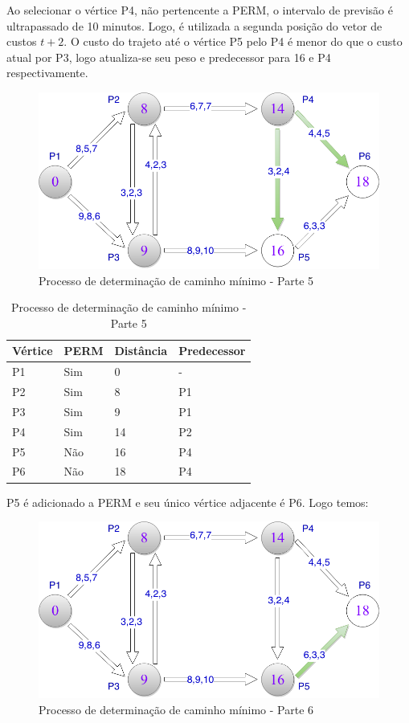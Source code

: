 Ao selecionar o vértice P4, não pertencente a PERM, o intervalo de previsão é ultrapassado
de 10 minutos. Logo, é utilizada a segunda posição do vetor de custos $t + 2$. O custo do trajeto até
o vértice P5 pelo P4 é menor do que o custo atual por P3, logo atualiza-se seu peso e predecessor
para 16 e P4 respectivamente.
\FloatBarrier
\begin{figure}[htbp]
\centering
 \includegraphics[width=.50\textwidth]{chapters/fig/leo6.png}
\caption{Processo de determinação de caminho mínimo - Parte 5}
\label{fig:leo6}
\end{figure}

\begin{table}[htbp]
	\centering
	\begin{tabular}{l l l l}
	\toprule
	Vértice & PERM & Distância & Predecessor\\
	\midrule
	P1 & Sim & 0 & - \\
	P2 & Sim & 8 & P1 \\
	P3 & Sim & 9 & P1 \\
	P4 & Sim & 14 & P2 \\
	P5 & Não & 16 & P4 \\
	P6 & Não & 18 & P4 \\
	\bottomrule
	\end{tabular}
\caption{Processo de determinação de caminho mínimo - Parte 5}
 \label{tab:leotab5}
\end{table}

P5 é adicionado a PERM e seu único vértice adjacente é P6. Logo temos:
\FloatBarrier
\begin{figure}[htbp]
\centering
 \includegraphics[width=.50\textwidth]{chapters/fig/leo7.png}
\caption{Processo de determinação de caminho mínimo - Parte 6}
\label{fig:leo7}
\end{figure}

